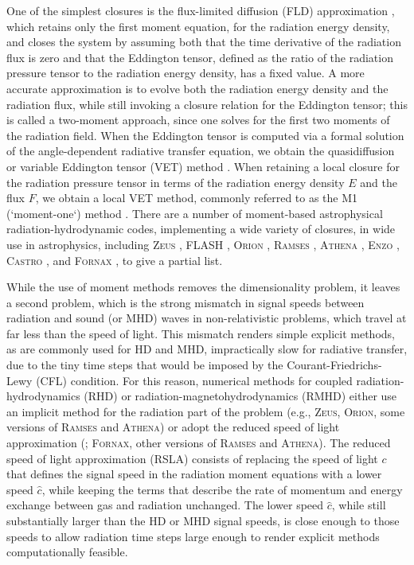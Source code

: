 \documentclass[fleqn,usenatbib]{mnras}
\begin{document}
One of the simplest closures is the flux-limited diffusion (FLD) approximation \citep{Alme_1973}, which retains only the first moment equation, for the radiation energy density, and closes the system by assuming both that the time derivative of the radiation flux is zero and that the Eddington tensor, defined as the ratio of the radiation pressure tensor to the radiation energy density, has a fixed value. A more accurate approximation is to evolve both the radiation energy density and the radiation flux, while still invoking a closure relation for the Eddington tensor; this is called a two-moment approach, since one solves for the first two moments of the radiation field. When the Eddington tensor is computed via a formal solution of the angle-dependent radiative transfer equation, we obtain the quasidiffusion or variable Eddington tensor (VET) method \citep{Goldin_1964}. When retaining a local closure for the radiation pressure tensor in terms of the radiation energy density $E$ and the flux $F$, we obtain a local VET method, commonly referred to as the M1 (`moment-one`) method \citep{Minerbo_1978,Levermore_1984,Dubroca_1999,Gonzalez_2007}. There are a number of moment-based astrophysical radiation-hydrodynamic codes, implementing a wide variety of closures, in wide use in astrophysics, including \textsc{Zeus} \citep{Turner_2001}, \textsc{FLASH} \citep{Fryxell_2000}, \textsc{Orion} \citep{Krumholz_2007, Shestakov08a, Li21a}, \textsc{Ramses} \citep{Commercon11a, Rosdahl_2013}, \textsc{Athena} \citep{Davis_2012, Jiang12a}, \textsc{Enzo} \citep{Reynolds_2009,Bryan_2014}, \textsc{Castro} \citep{Zhang_2011,Zhang_2013,Almgren_2020}, and \textsc{Fornax} \citep{Skinner_2019}, to give a partial list.

While the use of moment methods removes the dimensionality problem, it leaves a second problem, which is the strong mismatch in signal speeds between radiation and sound (or MHD) waves in non-relativistic problems, which travel at far less than the speed of light. This mismatch renders simple explicit methods, as are commonly used for HD and MHD, impractically slow for radiative transfer, due to the tiny time steps that would be imposed by the Courant-Friedrichs-Lewy (CFL) condition. For this reason, numerical methods for coupled radiation-hydrodynamics (RHD) or radiation-magnetohydrodynamics (RMHD) either use an implicit method for the radiation part of the problem (e.g., \textsc{Zeus}, \textsc{Orion}, some versions of \textsc{Ramses} and \textsc{Athena}) or adopt the reduced speed of light approximation (\citealt{Gnedin_2001, Skinner_2013}; \textsc{Fornax}, other versions of \textsc{Ramses} and \textsc{Athena}). The reduced speed of light approximation (RSLA) consists of replacing the speed of light $c$ that defines the signal speed in the radiation moment equations with a lower speed $\hat{c}$, while keeping the terms that describe the rate of momentum and energy exchange between gas and radiation unchanged. The lower speed $\hat{c}$, while still substantially larger than the HD or MHD signal speeds, is close enough to those speeds to allow radiation time steps large enough to render explicit methods computationally feasible.
\end{document}
